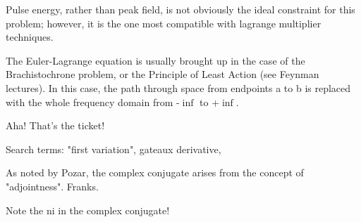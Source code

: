\documentclass[paper.tex]{subfiles}
\begin{document}
	
	


Pulse energy, rather than peak field, is not obviously the ideal constraint for this problem; however, it is the one most compatible with lagrange multiplier techniques.

The Euler-Lagrange equation is usually brought up in the case of the Brachistochrone problem, or the Principle of Least Action (see Feynman lectures). In this case, the path through space from endpoints a to b is replaced with the whole frequency domain from -$\inf$ to +$\inf$.

Aha! That's the ticket! 

Search terms: "first variation", gateaux derivative, 

As noted by Pozar, the complex conjugate arises from the concept of "adjointness". Franks.

Note the ni in the complex conjugate!
\end{document}
